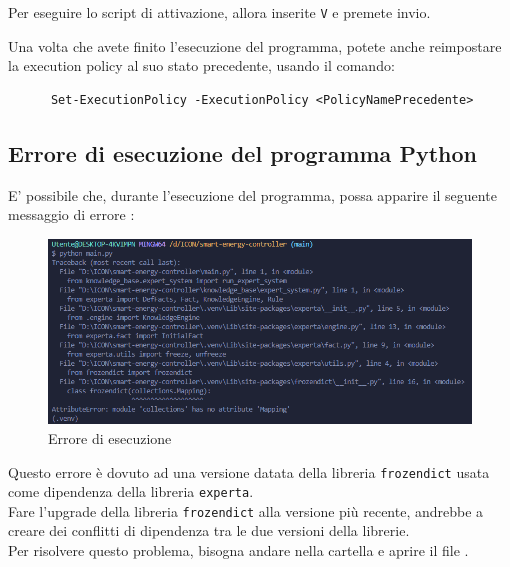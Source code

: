 \documentclass[12pt, letterpaper]{article}
\begin{document}
Per eseguire lo script di attivazione, allora inserite \texttt{V} e
premete invio. \\ \break

\noindent Una volta che avete finito l'esecuzione del programma, potete anche reimpostare
la execution policy al suo stato precedente, usando il comando:

\begin{verbatim}
      Set-ExecutionPolicy -ExecutionPolicy <PolicyNamePrecedente>
\end{verbatim}


\subsection{Errore di esecuzione del programma Python}
\label{sec:python-error}

E' possibile che, durante l'esecuzione del programma, possa apparire il seguente
messaggio di errore \cite{python-mapping-problem}: \\ \pagebreak

\begin{figure}[h]
      \centering
      \includegraphics[scale=0.55]{errore-python.png}
      \caption{Errore di esecuzione}
\end{figure}

\noindent Questo errore è dovuto ad una versione datata della libreria \texttt{frozendict}
usata come dipendenza della libreria \texttt{experta}. \\

\noindent Fare l'upgrade della libreria \texttt{frozendict} alla versione più recente, andrebbe a
creare dei conflitti di dipendenza tra le due versioni della librerie. \\

\noindent Per risolvere questo problema, bisogna andare nella cartella
 e aprire il file .
\end{document}

